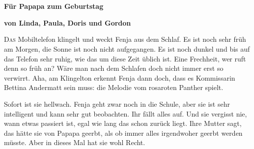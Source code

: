 \pagestyle{empty}
\section*{}
\centerline{\Huge \color{blue}\SixFlowerPetalDotted}
\vspace{13pt}
\centerline{\bf \large\color{blue}Für Papapa zum Geburtstag }
\vspace{13pt}
\centerline{\bf \color{blue} von Linda, Paula, Doris und Gordon}
\vspace{13pt}
\centerline{\huge \color{blue}\SixFlowerPetalDotted}
\vspace{13pt}
\centerline{\LARGE \color{blue}\SixFlowerPetalDotted}
\vspace{13pt}
\centerline{\Large \color{blue}\SixFlowerPetalDotted}
\vspace{13pt}
\centerline{\large \color{blue}\SixFlowerPetalDotted}
\vspace{13pt}
\centerline{\normalsize \color{blue}\SixFlowerPetalDotted}
\vspace{13pt}
\centerline{\small \color{blue}\SixFlowerPetalDotted}
\vspace{13pt}
\centerline{\footnotesize \color{blue}\SixFlowerPetalDotted}
\vspace{13pt}
\centerline{\scriptsize \color{blue}\SixFlowerPetalDotted}
\vspace{13pt}
\centerline{\tiny \color{blue}\SixFlowerPetalDotted}

\newpage
\pagestyle{scrheadings}

\lettrine[lines=3]{\color{blue}D}{as} Mobiltelefon klingelt und weckt Fenja aus dem Schlaf. Es ist noch sehr früh am Morgen, die Sonne ist noch nicht aufgegangen. Es ist noch dunkel und bis auf das Telefon sehr ruhig, wie das um diese Zeit üblich ist. Eine Frechheit, wer ruft denn so früh an? Wäre man nach dem Schlafen doch nicht immer erst so verwirrt. Aha, am Klingelton erkennt Fenja dann doch, dass es Kommissarin Bettina Andermatt sein muss: die Melodie vom rosaroten Panther spielt.

Sofort ist sie hellwach. Fenja geht zwar noch in die Schule, aber sie ist sehr intelligent und kann sehr gut beobachten. Ihr fällt alles auf. Und sie vergisst nie, wann etwas passiert ist, egal wie lang das schon zurück liegt. Ihre Mutter sagt, das hätte sie von Papapa geerbt, als ob immer alles irgendwoher geerbt werden müsste. Aber in dieses Mal hat sie wohl Recht. 

